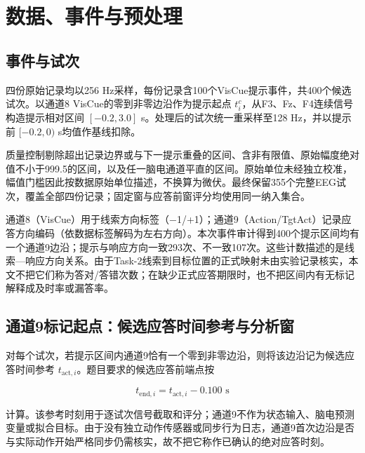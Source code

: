 \documentclass[UTF8,12pt,a4paper,fontset=windows]{ctexart}
\begin{document}
\hypertarget{ux6570ux636eux4e8bux4ef6ux4e0eux9884ux5904ux7406}{%
\section{数据、事件与预处理}\label{ux6570ux636eux4e8bux4ef6ux4e0eux9884ux5904ux7406}}

\hypertarget{ux4e8bux4ef6ux4e0eux8bd5ux6b21}{%
\subsection{事件与试次}\label{ux4e8bux4ef6ux4e0eux8bd5ux6b21}}

四份原始记录均以256 Hz采样，每份记录含100个VisCue提示事件，共400个候选试次。以通道8 VisCue的零到非零边沿作为提示起点 \(t_i^c\)，从F3、Fz、F4连续信号构造提示相对区间 \([-0.2,3.0]\) s。处理后的试次统一重采样至128 Hz，并以提示前 \([-0.2,0)\) s均值作基线扣除。

质量控制剔除超出记录边界或与下一提示重叠的区间、含非有限值、原始幅度绝对值不小于999.5的区间，以及任一脑电通道平直的区间。原始单位未经独立校准，幅值门槛因此按数据原始单位描述，不换算为微伏。最终保留355个完整EEG试次，覆盖全部四份记录；固定窗与应答前窗评分均使用同一纳入集合。

通道8（VisCue）用于线索方向标签（−1/+1）；通道9（Action/TgtAct）记录应答方向编码（依数据标签解码为左右方向）。本次事件审计得到400个提示区间均有一个通道9边沿；提示与响应方向一致293次、不一致107次。这些计数描述的是线索---响应方向关系。由于Task-2线索到目标位置的正式映射未由实验记录核实，本文不把它们称为答对/答错次数；在缺少正式应答期限时，也不把区间内有无标记解释成及时率或漏答率。

\hypertarget{ux901aux90539ux6807ux8bb0ux8d77ux70b9ux5019ux9009ux5e94ux7b54ux65f6ux95f4ux53c2ux8003ux4e0eux5206ux6790ux7a97}{%
\subsection{通道9标记起点：候选应答时间参考与分析窗}\label{ux901aux90539ux6807ux8bb0ux8d77ux70b9ux5019ux9009ux5e94ux7b54ux65f6ux95f4ux53c2ux8003ux4e0eux5206ux6790ux7a97}}

对每个试次，若提示区间内通道9恰有一个零到非零边沿，则将该边沿记为候选应答时间参考 \(t_{\mathrm{act},i}\)。题目要求的候选应答前端点按

\[
t_{\mathrm{end},i}=t_{\mathrm{act},i}-0.100\text{ s}
\]

计算。该参考时刻用于逐试次信号截取和评分；通道9不作为状态输入、脑电预测变量或拟合目标。由于没有独立动作传感器或同步行为日志，通道9首次边沿是否与实际动作开始严格同步仍需核实，故不把它称作已确认的绝对应答时刻。
\end{document}
